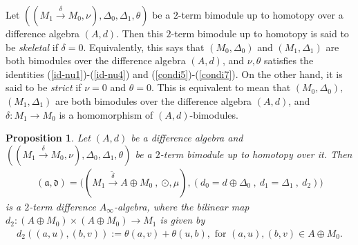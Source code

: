 \documentclass[a4paper,reqno,10pt]{amsart}
\theoremstyle{plain}
\newtheorem{prop}[thm]{Proposition}
\theoremstyle{definition}
\theoremstyle{remark}
\begin{document}
\medskip

Let $((M_1 \xrightarrow{\delta} M_0, \nu), \Delta_0, \Delta_1, \theta )$ be a $2$-term bimodule up to homotopy over a difference algebra $(A, d)$. Then this $2$-term bimodule up to homotopy is said to be {\em skeletal} if $\delta = 0$. Equivalently, this says that $(M_0, \Delta_0)$ and $(M_1, \Delta_1)$ are both bimodules over the difference algebra $(A, d)$, and $\nu, \theta$ satisfies the identities (\ref{id-nu1})-(\ref{id-nu4}) and (\ref{condi5})-(\ref{condi7}). On the other hand, it is said to be {\em strict} if $\nu = 0$ and $\theta = 0$. This is equivalent to mean that $(M_0, \Delta_0),$ $ ( M_1, \Delta_1)$ are both bimodules over the difference algebra $(A, d)$, and $\delta: M_1 \rightarrow M_0$ is a homomorphism of $(A,d)$-bimodules.

\begin{prop}\label{prop-2-diff-hom}
    Let $(A, d)$ be a difference algebra and $( (M_1 \xrightarrow{ \delta} M_0, \nu ), \Delta_0, \Delta_1, \theta)$ be a $2$-term bimodule up to homotopy over it. Then 
    \begin{align*}
        (\mathfrak{a}, \mathfrak{d}) = \big(   ( M_1 \xrightarrow{\widetilde{\delta } } A \oplus M_0 ~ \! , ~ \! \odot, \mu ), (d_0 = d \oplus \Delta_0 ~ \! , ~ \! d_1= \Delta_1 ~ \!, ~ \! d_2)   \big)
    \end{align*}
    is a $2$-term difference $A_\infty$-algebra, where the bilinear map $d_2 : (A \oplus M_0) \times (A \oplus M_0) \rightarrow M_1$ is given by
    \begin{align*}
        d_2 ((a, u), (b, v) ):= \theta (a, v) + \theta (u, b), \text{ for } (a, u), (b, v) \in A \oplus M_0.
    \end{align*}
\end{prop}
\end{document}
